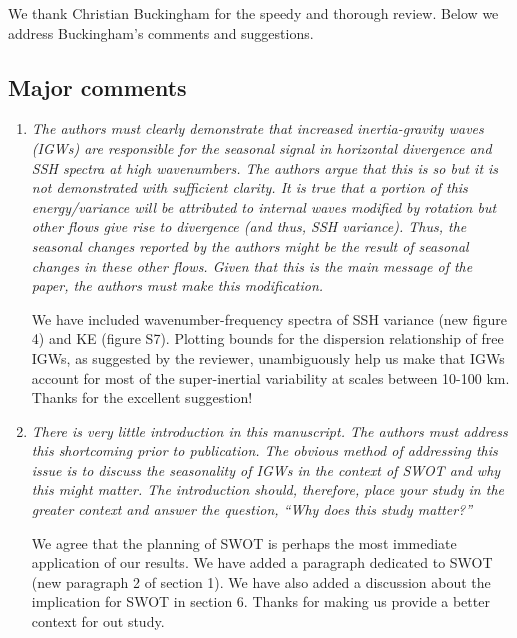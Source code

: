 \documentclass[11pt]{article}
\newcommand{\bdp}{\begin{description}}
\newcommand{\edp}{\end{description}}
\begin{document}
        We thank  Christian Buckingham for the speedy and thorough review. Below we address
                  Buckingham's comments and suggestions.


\subsection{Major comments}

\begin{enumerate}

  \item {\it The authors must clearly demonstrate that increased inertia-gravity waves (IGWs) are
        responsible for the seasonal signal in horizontal divergence and SSH spectra at high
        wavenumbers. The authors argue that this is so but it is not demonstrated with sufficient
        clarity. It is true that a portion of this energy/variance will be attributed to internal waves
        modified by rotation but other flows give rise to divergence (and thus, SSH variance). Thus,
        the seasonal changes reported by the authors might be the result of seasonal changes in these
        other flows. Given that this is the main message of the paper, the authors must make this
        modification.}\\

        \bdp
            We have included wavenumber-frequency
            spectra of SSH variance (new figure 4) and KE (figure S7). Plotting bounds for the
            dispersion relationship of free IGWs, as suggested by the reviewer, unambiguously
            help us make that IGWs account for most of the super-inertial variability at
            scales between 10-100 km. Thanks for the excellent suggestion!
        \edp

  \item {\it There is very little introduction in this manuscript. The authors must address this
          shortcoming prior to publication. The obvious method of addressing this issue is to discuss
          the seasonality of IGWs in the context of SWOT and why this might matter. The introduction
          should, therefore, place your study in the greater context and answer the question,
          ``Why does this study matter?''}\\

          \bdp
              We agree that the planning of SWOT is perhaps the most immediate
              application of our results. We have added a paragraph dedicated to SWOT (new
              paragraph 2 of section 1). We have also added a discussion about the
              implication for SWOT in section 6. Thanks for making us provide a better
              context for out study.
          \edp


\end{enumerate}
\end{document}

